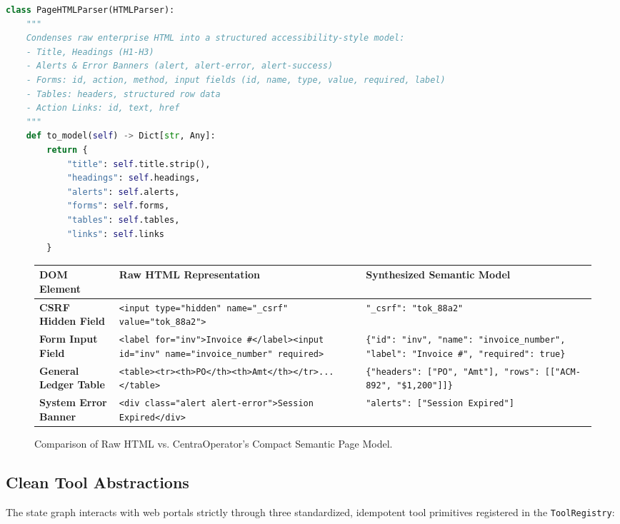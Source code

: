 \begin{lstlisting}[language=Python, caption={Compact Semantic Page Model Generator (\texttt{services/runtime/tools/web.py})}]
class PageHTMLParser(HTMLParser):
    """
    Condenses raw enterprise HTML into a structured accessibility-style model:
    - Title, Headings (H1-H3)
    - Alerts & Error Banners (alert, alert-error, alert-success)
    - Forms: id, action, method, input fields (id, name, type, value, required, label)
    - Tables: headers, structured row data
    - Action Links: id, text, href
    """
    def to_model(self) -> Dict[str, Any]:
        return {
            "title": self.title.strip(),
            "headings": self.headings,
            "alerts": self.alerts,
            "forms": self.forms,
            "tables": self.tables,
            "links": self.links
        }
\end{lstlisting}

\begin{figure}[htbp]
  \centering
  \small
  \begin{tabularx}{\textwidth}{p{3.5cm} p{5.5cm} X}
    \toprule
    \textbf{DOM Element} & \textbf{Raw HTML Representation} & \textbf{Synthesized Semantic Model} \\
    \midrule
    \textbf{CSRF Hidden Field} & \texttt{<input type="hidden" name="\_csrf" value="tok\_88a2">} & \texttt{"\_csrf": "tok\_88a2"} \\
    \addlinespace
    \textbf{Form Input Field} & \texttt{<label for="inv">Invoice \#</label><input id="inv" name="invoice\_number" required>} & \texttt{\{"id": "inv", "name": "invoice\_number", "label": "Invoice \#", "required": true\}} \\
    \addlinespace
    \textbf{General Ledger Table} & \texttt{<table><tr><th>PO</th><th>Amt</th></tr>...</table>} & \texttt{\{"headers": ["PO", "Amt"], "rows": [["ACM-892", "\$1,200"]]\}} \\
    \addlinespace
    \textbf{System Error Banner} & \texttt{<div class="alert alert-error">Session Expired</div>} & \texttt{"alerts": ["Session Expired"]} \\
    \bottomrule
  \end{tabularx}
  \caption{Comparison of Raw HTML vs. CentraOperator's Compact Semantic Page Model.}
  \label{tab:semantic_page_model}
\end{figure}

\subsection{Clean Tool Abstractions}
The state graph interacts with web portals strictly through three standardized, idempotent tool primitives registered in the \texttt{ToolRegistry}:

